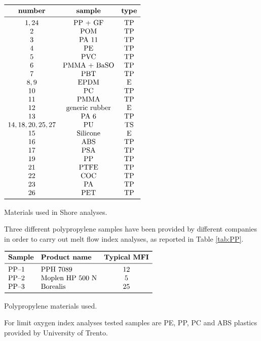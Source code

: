 \documentclass[a4paper, 11pt]{article}
\begin{document}
\begin{table}[htp]
	\centering
	$
	\begin{array}{ccc}
	\toprule
	\textbf{number} & \textbf{sample} & \textbf{type} \\
	\midrule
	1,24 & \text{PP + GF} & \text{TP}\\
	2 & \text{POM} & \text{TP}\\
	3 & \text{PA 11} & \text{TP}\\
	4 & \text{PE} & \text{TP}\\
	5 & \text{PVC} & \text{TP}\\
	6 & \text{PMMA + BaSO} & \text{TP}\\
	7 & \text{PBT} & \text{TP}\\
	8,9 & \text{EPDM} & \text{E}\\
    10 & \text{PC} & \text{TP}\\
	11 & \text{PMMA} & \text{TP}\\
	12 & \text{generic rubber} & \text{E}\\
	13 & \text{PA 6} & \text{TP}\\
	14,18,20,25,27 & \text{PU} & \text{TS}\\
	15 & \text{Silicone} & \text{E}\\
	16 & \text{ABS} & \text{TP}\\
	17 & \text{PSA} & \text{TP}\\
	19 & \text{PP} & \text{TP}\\
	21 & \text{PTFE} & \text{TP}\\
	22 & \text{COC} & \text{TP}\\
	23 & \text{PA} & \text{TP}\\
	26 & \text{PET} & \text{TP}\\
	\bottomrule
	\end{array}
	$
	\caption{Materials used in Shore analyses.}
	\label{tab:polymers}
\end{table}
Three different polypropylene samples have been provided by different companies in order to carry out melt flow index analyses, as reported in Table \ref{tab:PP}. 
\begin{table}[htp]
	\centering
	$
	\begin{array}{llc}
	\toprule
	\textbf{Sample} & \textbf{Product name} & \textbf{Typical MFI} \\
	\midrule
	\text{PP–1} & \text{PPH 7089} & 12\\
	\text{PP–2} & \text{Moplen HP 500 N} & 5\\
	\text{PP–3} & \text{Borealis} & 25\\
	\bottomrule
	\end{array}
	$
	\caption{Polypropylene materials used.}
	\label{tab:PP}
\end{table}
For limit oxygen index analyses tested samples are PE, PP, PC and ABS plastics provided by University of Trento. 
\end{document}
